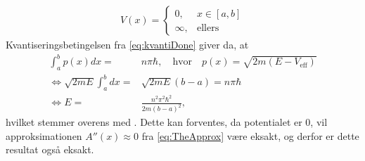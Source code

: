 \begin{align}
    V(x) =
    \begin{cases}
    0, & x\in[a, b] \\
    \infty, & \text{ellers}
    \end{cases}
\end{align}
Kvantiseringsbetingelsen fra \cref{eq:kvantiDone} giver da, at
\begin{align}
    \int_{a}^{b} p(x) dx = & n\pi \hbar, \quad \text{hvor} \quad p(x) = \sqrt{2m(E-V_{\text{eff}})}\\
    \Leftrightarrow \sqrt{2mE}\int_{a}^{b} dx = & \sqrt{2mE}(b-a) = n\pi \hbar\\
    \Leftrightarrow E = & \frac{n^{2}\pi^{2}\hbar^{2}}{2m(b-a)^{2}},
\end{align}
hvilket stemmer overens med \cite[s. 30]{griffiths}. Dette kan forventes, da potentialet er $0$, vil approksimationen $A''(x) \approx 0$ fra \cref{eq:TheApprox} være eksakt, og derfor er dette resultat også eksakt.
